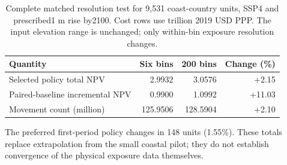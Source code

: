 \begin{table}[htbp]
\centering\small
\begin{tabular}{lrrr}
\toprule
Quantity & Six bins & 200 bins & Change (\%) \\
\midrule
Selected policy total NPV & 2.9932 & 3.0576 & +2.15 \\
Paired-baseline incremental NPV & 0.9900 & 1.0992 & +11.03 \\
Movement count (million) & 125.9506 & 128.5904 & +2.10 \\
\bottomrule\end{tabular}
\caption{Complete matched resolution test for 9,531 coast-country units, SSP4 and prescribed1 m rise by2100. Cost rows use trillion 2019 USD PPP. The input elevation range is unchanged; only within-bin exposure resolution changes.}
\end{table}
The preferred first-period policy changes in 148 units (1.55\%). These totals replace extrapolation from the small coastal pilot; they do not establish convergence of the physical exposure data themselves.
